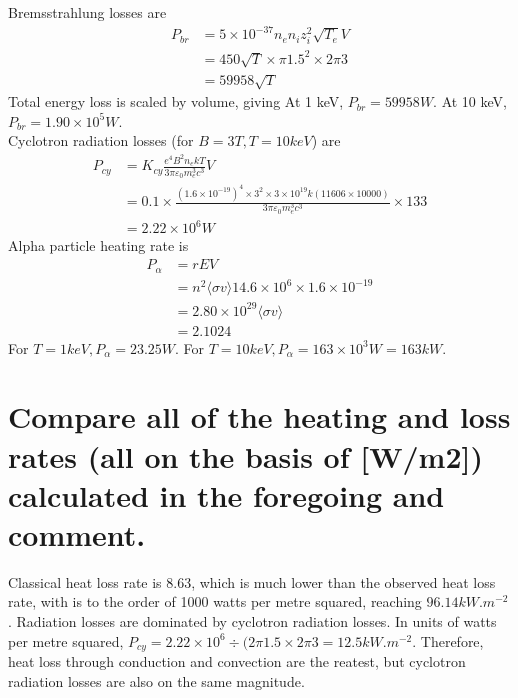 \documentclass[answers]{exam}
\begin{document}
\begin{questions}
\begin{parts}
\begin{solution}
    Bremsstrahlung losses are
    \begin{align*}
        P_{br} &= 5 \times 10^{-37}n_en_iz_i^2\sqrt{T_e}V \\
               &= 450\sqrt{T} \times \pi1.5^2 \times 2\pi 3 \\
               &= 59958\sqrt{T}
    \end{align*}
    Total energy loss is scaled by volume, giving
    At 1 keV, $P_{br} = 59958\unit{W}$. At 10 keV, $P_{br} = 1.90\times10^5\unit{W}$. \\
    Cyclotron radiation losses (for $B = 3\unit{T}, T = 10\unit{keV}$) are
    \begin{align*}
        P_{cy} &= K_{cy} \frac{e^4B^2n_ekT}{3\pi\varepsilon_0m_e^3c^3}V \\
               &= 0.1 \times \frac{\left(1.6\times10^{-19}\right)^4\times3^2\times3\times10^{19}k(11606\times10000)}{3\pi\varepsilon_0m_e^3c^3}\times 133 \\
               &= 2.22 \times 10^6\unit{W}
    \end{align*}
    Alpha particle heating rate is
    \begin{align*}
        P_\alpha &= rEV \\
                 &= n^2\langle\sigma v\rangle 14.6 \times 10^6 \times 1.6 \times 10^{-19} \\
                 &= 2.80 \times 10^{29} \langle \sigma v \rangle \\
                 &= 2.1024
    \end{align*}
    For $T = 1\unit{keV}, P_\alpha = 23.25\unit{W}$. For $T = 10\unit{keV}, P_\alpha = 163 \times 10^3\unit{W} = 163\unit{kW}$.
\end{solution}

\part{Compare all of the heating and loss rates (all on the basis of [W/m2]) calculated in the foregoing and comment.}

\begin{solution}
    Classical heat loss rate is 8.63, which is much lower than the observed heat loss rate, with is to the order of 1000 watts per metre squared, reaching $96.14\unit{kW.m^{-2}}$. Radiation losses are dominated by cyclotron radiation losses. In units of watts per metre squared, $P_{cy} = 2.22 \times 10^6 \div(2\pi1.5\times2\pi3 = 12.5 \unit{kW.m^{-2}}$. Therefore, heat loss through conduction and convection are the reatest, but cyclotron radiation losses are also on the same magnitude.
\end{solution}

\end{parts}
\end{questions}
\end{document}
